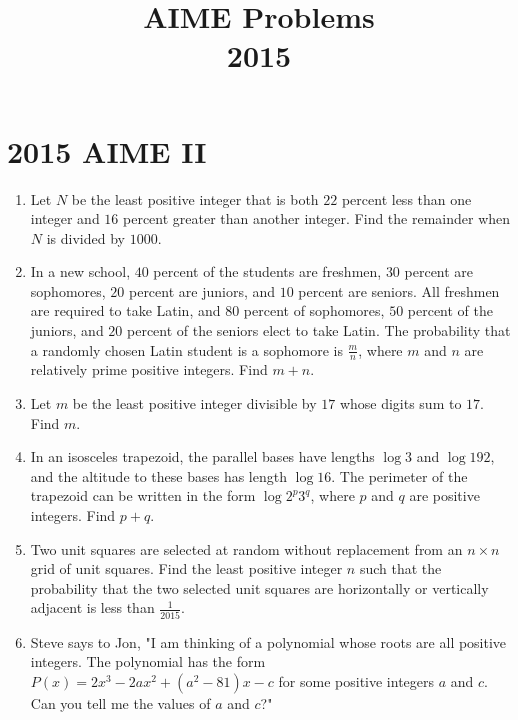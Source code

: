 \documentclass{article}
\title{AIME Problems \\ 2015}
\date{}
\begin{document}
\maketitle\thispagestyle{fancy}\newpage\section*{2015 AIME II}\begin{enumerate}[label=\arabic*., itemsep=0.5em]\item Let \(N\) be the least positive integer that is both \(22\) percent less than one integer and \(16\) percent greater than another integer. Find the remainder when \(N\) is divided by \(1000\).\par \vspace{0.5em}\item In a new school, \(40\) percent of the students are freshmen, \(30\) percent are sophomores, \(20\) percent are juniors, and \(10\) percent are seniors. All freshmen are required to take Latin, and \(80\) percent of sophomores, \(50\) percent of the juniors, and \(20\) percent of the seniors elect to take Latin. The probability that a randomly chosen Latin student is a sophomore is \(\frac{m}{n}\), where \(m\) and \(n\) are relatively prime positive integers. Find \(m+n\).\par \vspace{0.5em}\item Let \(m\) be the least positive integer divisible by \(17\) whose digits sum to \(17\). Find \(m\).\par \vspace{0.5em}\item In an isosceles trapezoid, the parallel bases have lengths \(\log 3\) and \(\log 192\), and the altitude to these bases has length \(\log 16\). The perimeter of the trapezoid can be written in the form \(\log 2^p 3^q\), where \(p\) and \(q\) are positive integers. Find \(p + q\).\par \vspace{0.5em}\item Two unit squares are selected at random without replacement from an \(n \times n\) grid of unit squares. Find the least positive integer \(n\) such that the probability that the two selected unit squares are horizontally or vertically adjacent is less than \(\frac{1}{2015}\).\par \vspace{0.5em}\item Steve says to Jon, "I am thinking of a polynomial whose roots are all positive integers. The polynomial has the form \(P(x) = 2x^3-2ax^2+(a^2-81)x-c\) for some positive integers \(a\) and \(c\). Can you tell me the values of \(a\) and \(c\)?"


\end{enumerate}
\end{document}
